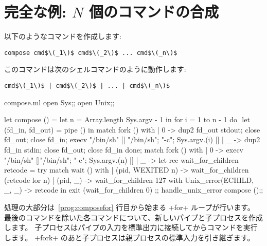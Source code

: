 \section{完全な例: $N$ 個のコマンドの合成}

以下のようなコマンドを作成します:
\begin{lstlisting}
compose cmd$\(_1\)$ cmd$\(_2\)$ ... cmd$\(_n\)$
\end{lstlisting}
このコマンドは次のシェルコマンドのように動作します:
\begin{lstlisting}
cmd$\(_1\)$ | cmd$\(_2\)$ | ... | cmd$\(_n\)$
\end{lstlisting}
\begin{listingcodefile}[style=numbers]{compose.ml}
open Sys;;
open Unix;;

let compose () =
  let n = Array.length Sys.argv - 1 in
  for i = 1 to n - 1 do $\label{prog:composefor}$
    let (fd_in, fd_out) = pipe () in
    match fork () with
    | 0 ->
        dup2 fd_out stdout;
        close fd_out;
        close fd_in;
        execv "/bin/sh" [| "/bin/sh"; "-c"; Sys.argv.(i) |]
    | _ ->
        dup2 fd_in stdin;
        close fd_out;
        close fd_in
  done;
  match fork () with
  | 0 -> execv "/bin/sh" [|"/bin/sh"; "-c"; Sys.argv.(n) |]
  | _ ->
      let rec wait_for_children retcode =
        try
          match wait () with
          | (pid, WEXITED n) -> wait_for_children (retcode lor n)
          | (pid, _)         -> wait_for_children 127
        with
          Unix_error(ECHILD, _, _) -> retcode in
      exit (wait_for_children 0)
;;
handle_unix_error compose ();;
\end{listingcodefile}
%
処理の大部分は~\ref{prog:composefor} 行目から始まる \ml+for+ ループが行います。
最後のコマンドを除いた各コマンドについて、新しいパイプと子プロセスを作成します。
子プロセスはパイプの入力を標準出力に接続してからコマンドを実行します。
\ml+fork+ のあと子プロセスは親プロセスの標準入力を引き継ぎます。
